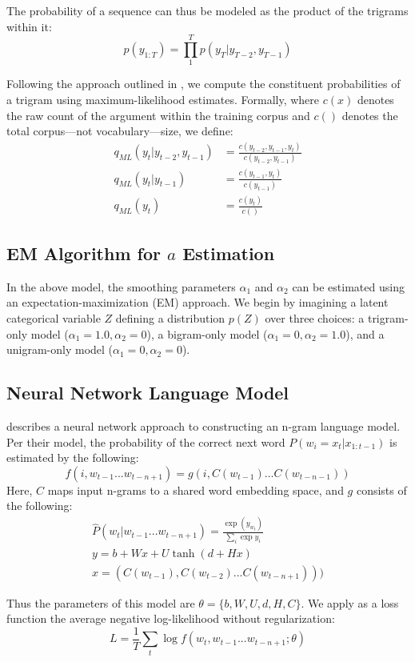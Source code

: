 \documentclass[11pt]{article}
\begin{document}
The probability of a sequence can thus be modeled as the product of the trigrams within it:
$$ p(y_{1:T}) = \prod_{1}^{T} p(y_T|y_{T-2},y_{T-1}) $$

Following the approach outlined in \cite{collins2013}, we compute the constituent probabilities of a trigram using maximum-likelihood estimates. Formally, where $c(x)$ denotes the raw count of the argument within the training corpus and $c()$ denotes the total corpus---not vocabulary---size, we define:
\begin{align*}
  q_{ML}(y_t|y_{t-2},y_{t-1}) &= \frac{c(y_{t-2}, y_{t-1}, y_t)}{c(y_{t-2}, y_{t-1})} \\
  q_{ML}(y_t|y_{t-1}) &= \frac{c(y_{t-1}, y_t)}{c(y_{t-1})} \\
  q_{ML}(y_t) &= \frac{c(y_t)}{c()}
\end{align*}

\subsection{EM Algorithm for $a$ Estimation}

In the above model, the smoothing parameters $\alpha_1$ and $\alpha_2$ can be estimated using an expectation-maximization (EM) approach. We begin by imagining a latent categorical variable $Z$ defining a distribution $p(Z)$ over three choices: a trigram-only model ($\alpha_1=1.0,\alpha_2=0$), a bigram-only model ($\alpha_1=0,\alpha_2=1.0$), and a unigram-only model ($\alpha_1=0,\alpha_2=0$).


\subsection{Neural Network Language Model}

\cite{bengio2003neural} describes a neural network approach to constructing an n-gram language model. Per their model, the probability of the correct next word $P(w_i = x_t|x_{1:t-1})$ is estimated by the following:
$$f(i, w_{t-1}...w_{t-n+1}) = g(i, C(w_{t-1})...C(w_{t-n-1}))$$
Here, $C$ maps input n-grams to a shared word embedding space, and $g$ consists of the following:
\begin{align*}
  \hat{P}(w_t|w_{t-1}...w_{t-n+1})=\frac{\exp(y_{w_t})}{\sum_{i}\exp{y_i}} \\
  y = b+Wx+U\tanh(d+Hx) \\
  x = (C(w_{t-1}),C(w_{t-2})...C(w_{t-n+1})))
\end{align*}

Thus the parameters of this model are $\theta=\{b,W,U,d,H,C\}$. We apply as a loss function the average negative log-likelihood without regularization:
$$L=\frac{1}{T} \sum_{t} \log f(w_t,w_{t-1}...w_{t-n+1}; \theta)$$
\end{document}

